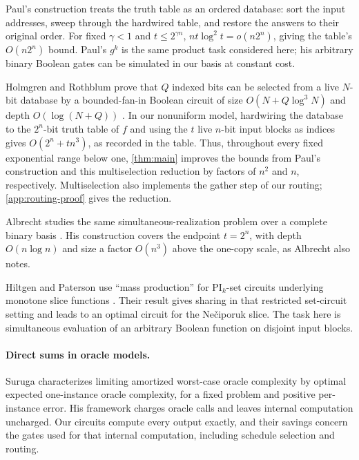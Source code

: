 \documentclass[11pt]{article}
\begin{document}
Paul's construction treats the truth table as an ordered database: sort the
input addresses, sweep through the hardwired table, and restore the answers
to their original order.  For fixed $\gamma<1$ and $t\le2^{\gamma n}$,
$nt\log^2t=o(n2^n)$, giving the table's $O(n2^n)$ bound.
Paul's $g^k$ is the same product task considered here; his arbitrary binary
Boolean gates can be simulated in our basis at constant cost.

Holmgren and Rothblum prove that $Q$ indexed bits can be selected from a live
$N$-bit database by a bounded-fan-in Boolean circuit of size
$O(N+Q\log^3N)$ and depth $O(\log(N+Q))$
\cite[Main theorem]{HolmgrenRothblum2024}.  In our nonuniform model, hardwiring
the database to the $2^n$-bit truth table of $f$ and using the $t$ live
$n$-bit input blocks as indices gives $O(2^n+tn^3)$, as recorded in the table.
Thus, throughout every fixed exponential range below one, \cref{thm:main}
improves the bounds from Paul's construction and this multiselection reduction
by factors of $n^2$ and $n$, respectively.  Multiselection also implements the
gather step of our routing; \cref{app:routing-proof} gives the reduction.

Albrecht studies the same simultaneous-realization problem over a complete
binary basis \cite[Theorem~1, pp.~53--54]{Albrecht1989}.  His construction
covers the endpoint $t=2^n$, with depth $O(n\log n)$ and size a factor
$O(n^3)$ above the one-copy scale, as Albrecht also notes.

Hiltgen and Paterson use ``mass production'' for $\mathrm{PI}_k$-set circuits
underlying monotone slice functions \cite{HiltgenPaterson1995}.  Their result
gives sharing in that restricted set-circuit setting and leads to an optimal
circuit for the Ne\v{c}iporuk slice.  The task here is simultaneous evaluation
of an arbitrary Boolean function on disjoint input blocks.

\paragraph{Direct sums in oracle models.}
Suruga \cite[Theorem~1]{Suruga2024} characterizes limiting amortized
worst-case oracle complexity by optimal expected one-instance oracle
complexity, for a fixed problem and positive per-instance error.
His framework charges oracle calls and leaves internal computation
uncharged.  Our circuits compute every output exactly, and their savings
concern the gates used for that internal computation, including schedule
selection and routing.
\end{document}
